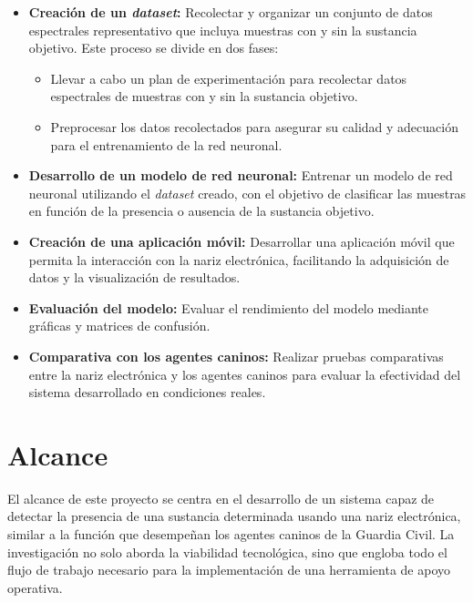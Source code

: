 \begin{itemize}
    \item \textbf{Creación de un \textit{dataset}:} Recolectar y organizar un conjunto de datos espectrales representativo que incluya muestras con y sin la sustancia objetivo. Este proceso se divide en dos fases:
    \begin{itemize}
        \item Llevar a cabo un plan de experimentación para recolectar datos espectrales de muestras con y sin la sustancia objetivo.
        \item Preprocesar los datos recolectados para asegurar su calidad y adecuación para el entrenamiento de la red neuronal.
    \end{itemize}

    \item \textbf{Desarrollo de un modelo de red neuronal:} Entrenar un modelo de red neuronal utilizando el \textit{dataset} creado, con el objetivo de clasificar las muestras en función de la presencia o ausencia de la sustancia objetivo.
    
    \item \textbf{Creación de una aplicación móvil:} Desarrollar una aplicación móvil que permita la interacción con la nariz electrónica, facilitando la adquisición de datos y la visualización de resultados.
    
    \item \textbf{Evaluación del modelo:} Evaluar el rendimiento del modelo mediante gráficas y matrices de confusión.
    
    \item \textbf{Comparativa con los agentes caninos:} Realizar pruebas comparativas entre la nariz electrónica y los agentes caninos para evaluar la efectividad del sistema desarrollado en condiciones reales.
\end{itemize}

\section{Alcance}
El alcance de este proyecto se centra en el desarrollo de un sistema capaz de detectar la presencia de una sustancia determinada usando una nariz electrónica, similar a la función que desempeñan los agentes caninos de la Guardia Civil. La investigación no solo aborda la viabilidad tecnológica, sino que engloba todo el flujo de trabajo necesario para la implementación de una herramienta de apoyo operativa.
\par

